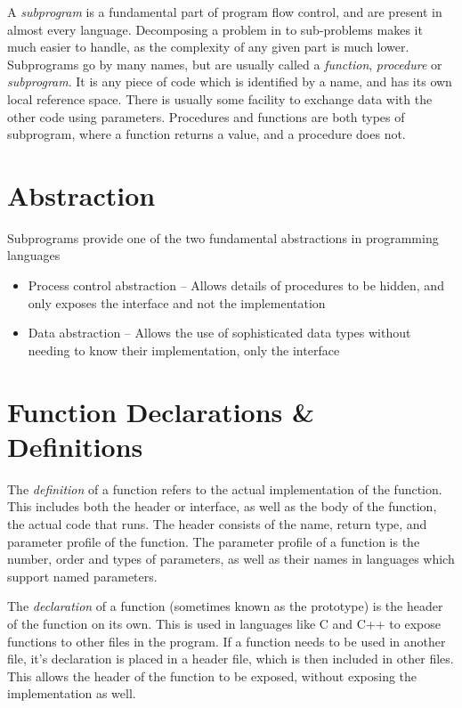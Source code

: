 
A \textit{subprogram} is a fundamental part of program flow control, and are present in almost every language. Decomposing
 a problem in to sub-problems makes it much easier to handle, as the complexity of any given part is much lower.
 Subprograms go by many names, but are usually called a \textit{function}, \textit{procedure} or \textit{subprogram}. It
 is any piece of code which is identified by a name, and has its own local reference space. There is usually some
 facility to exchange data with the other code using parameters. Procedures and functions are both types of subprogram,
 where a function returns a value, and a procedure does not.

\section*{Abstraction}

Subprograms provide one of the two fundamental abstractions in programming languages
\begin{itemize}
  \item Process control abstraction -- Allows details of procedures to be hidden, and only exposes the interface and not
   the implementation
  \item Data abstraction -- Allows the use of sophisticated data types without needing to know their implementation, only
   the interface
\end{itemize}

\section*{Function Declarations \& Definitions}

The \textit{definition} of a function refers to the actual implementation of the function. This includes both the header
 or interface, as well as the body of the function, the actual code that runs. The header consists of the name, return
 type, and parameter profile of the function. The parameter profile of a function is the number, order and types of
 parameters, as well as their names in languages which support named parameters.
 
The \textit{declaration} of a function (sometimes known as the prototype) is the header of the function on its own. This
 is used in languages like C and C++ to expose functions to other files in the program. If a function needs to be used
 in another file, it's declaration is placed in a header file, which is then included in other files. This allows the
 header of the function to be exposed, without exposing the implementation as well.

